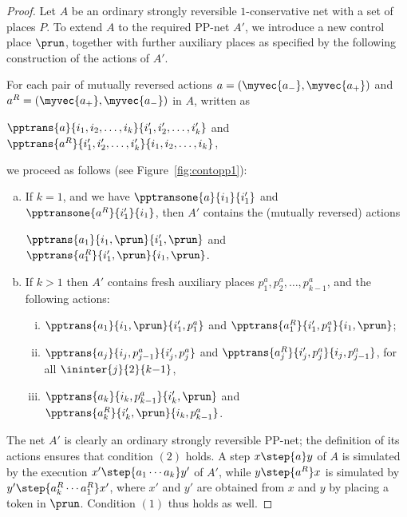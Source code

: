 \begin{proof}
Let $A$ be an ordinary strongly reversible
    $1$-conservative net with a set of places $P$.
To extend $A$ to the required PP-net $A'$,
	we introduce a new control place $\prun$, 
together with further auxiliary places as specified by the following construction of the actions of $A'$.

For each pair of mutually reversed actions
	$a=(\myvec{a_-},\myvec{a_+})$ and
	$a^R=(\myvec{a_+},\myvec{a_-})$  in $A$, written as 
	\begin{center}
$\pptrans{a}{i_1,i_2,\dots,i_k}{i'_1,i'_2,\dots,i'_k}$ and
$\pptrans{a^R}{i'_1,i'_2,\dots,i'_k}{i_1,i_2,\dots,i_k}$,
	\end{center}
		we proceed as follows (see
	Figure~\ref{fig:contopp1}):
	\begin{enumerate}[(a)]	
        \item   If $k=1$, and we have 
		$\pptransone{a}{i_1}{i'_1}$ and 
		    $\pptransone{a^R}{i'_1}{i_1}$, then $A'$ contains
		    the (mutually reversed) actions 
		    \begin{center}
		    $\pptrans{a_1}{i_1,\prun}{i'_1,\prun}$ and
        $\pptrans{a_1^R}{i'_1,\prun}{i_1,\prun}$.
		    \end{center}			    
	    \item
		If $k > 1$ then
$A'$ contains fresh auxiliary places $p^a_1,p^a_2,\dots,p^a_{k-1}$, and 
 the following actions:
			\begin{enumerate}[(i)]
            \item 
            $\pptrans{a_1}{i_1,\prun}{i'_1,p^a_1}$ and 
            $\pptrans{a_1^R}{i'_1,p^a_1}{i_1,\prun}$;
            \item
            $\pptrans{a_j}{i_j,p^a_{j-1}}{i'_j,p^a_j}$ and
             $\pptrans{a_j^R}{i'_j,p^a_j}{i_j,p^a_{j-1}}$,
			for all $\ininter{j}{2}{k{-}1}$, 

            \item 
            $\pptrans{a_k}{i_k,p^a_{k-1}}{i'_k,\prun}$ and
            $\pptrans{a_k^R}{i'_k,\prun}{i_k,p^a_{k-1}}$.
        \end{enumerate}
    \end{enumerate}
The net $A'$ is clearly an ordinary strongly reversible PP-net; 
	the definition of its actions ensures that condition $(2)$ holds.
A step $x\step{a}y$ of $A$ is simulated
by the execution $x'\step{a_1\cdots a_k}y'$ of $A'$, 
	while $y\step{a^R}x$
	is simulated by $y'\step{a^R_k\cdots a^R_1}x'$, 
	where $x'$ and $y'$ are obtained from $x$ and $y$ by placing a token
	in $\prun$. Condition $(1)$ thus holds as well.
\end{proof}


